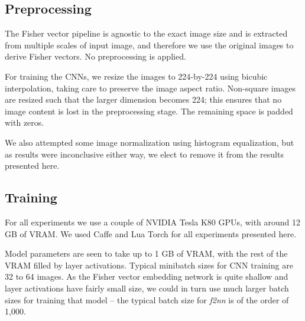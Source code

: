 \documentclass[10pt,twocolumn,letterpaper]{article}
\begin{document}
    \subsection{Preprocessing \label{sec:expt:preprocessing}}
        The Fisher vector pipeline is agnostic to the exact image size and is extracted from multiple scales of input image, and therefore we use the original images to derive Fisher vectors. No preprocessing is applied.
        
        For training the CNNs, we resize the images to 224-by-224 using bicubic interpolation, taking care to preserve the image aspect ratio. Non-square images are resized such that the larger dimension becomes 224; this ensures that no image content is lost in the preprocessing stage. The remaining space is padded with zeros.
        
        We also attempted some image normalization using histogram equalization, but as results were inconclusive either way, we elect to remove it from the results presented here.
        
    \subsection{Training \label{sec:expt:training}}
        For all experiments we use a couple of NVIDIA Tesla K80 GPUs, with around 12 GB of VRAM. We used Caffe \cite{jia2014caffe} and Lua Torch \cite{torch} for all experiments presented here.
        
        Model parameters are seen to take up to 1 GB of VRAM, with the rest of the VRAM filled by layer activations. Typical minibatch sizes for CNN training are 32 to 64 images. As the Fisher vector embedding network is quite shallow and layer activations have fairly small size, we could in turn use much larger batch sizes for training that model -- the typical batch size for \emph{f2nn} is of the order of 1,000.
        
\end{document}
